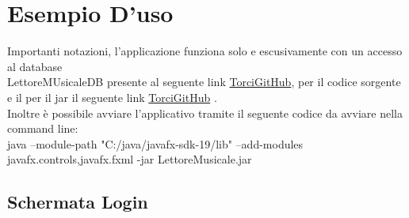 \documentclass[11pt]{article}
\begin{document}
	\clearpage
	\section{Esempio D'uso}
	Importanti notazioni, l'applicazione funziona solo e escusivamente con un accesso al database \\
	LettoreMUsicaleDB presente al seguente link \href{https://github.com/torcy-it/PROGETTO-BD-OO}{TorciGitHub}, per il codice sorgente e il per il jar il seguente link \href{https://github.com/torcy-it/LettoreMusicale/tree/main/src}{TorciGitHub} .\\
	Inoltre è possibile avviare l'applicativo tramite il seguente codice da avviare nella command line:\\
	java --module-path "C:/java/javafx-sdk-19/lib" --add-modules javafx.controls,javafx.fxml -jar LettoreMusicale.jar

	\subsection{Schermata Login}
\end{document}
